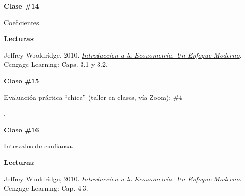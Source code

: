 \documentclass[letterpaper]{article}
\renewenvironment{itemize}{
  \begin{list}{}{
    \setlength{\leftmargin}{1.5em}
  }
}{
  \end{list}
}
\begin{document}
\begin{enumerate}
			\begin{itemize} 
				\item[$\bullet$] {\bf Clase \#14}
					\begin{itemize} 
						\item[$\circ$] Coeficientes. %
						\item[$\circ$] {\bf Lecturas}: 
							\begin{itemize}
								\item[$\diamond$] Jeffrey Wooldridge, 2010. \href{https://github.com/hbahamonde/Metodos_Cuanti_I/raw/master/Readings/Wooldridge.pdf}{\emph{Introducci\'on a la Econometr\'ia. Un Enfoque Moderno}}. Cengage Learning: Caps. 3.1 y 3.2.
							\end{itemize}
					\end{itemize}
			\end{itemize}



			\begin{itemize} 
				\item[$\bullet$] {\bf Clase \#15}
					\begin{itemize} 
						{\color{red}\item[\Pointinghand] Evaluaci\'on pr\'actica ``chica'' (taller en clases, v\'ia Zoom): \#4}.
					\end{itemize}
			\end{itemize}



			\begin{itemize} 
				\item[$\bullet$] {\bf Clase \#16}
					\begin{itemize} 
						\item[$\circ$] Intervalos de confianza. %
						\item[$\circ$] {\bf Lecturas}: 
							\begin{itemize}
								\item[$\diamond$] Jeffrey Wooldridge, 2010. \href{https://github.com/hbahamonde/Metodos_Cuanti_I/raw/master/Readings/Wooldridge.pdf}{\emph{Introducci\'on a la Econometr\'ia. Un Enfoque Moderno}}. Cengage Learning: Cap. 4.3.
							\end{itemize}
					\end{itemize}
			\end{itemize}




\end{enumerate}
\end{document}
